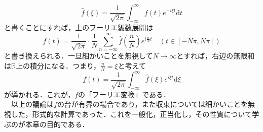 \documentclass[a4j]{jsbook}
\numberwithin{theorem}{chapter}  %
\begin{document}
\begin{equation*}
    \hat{f}(\xi)=\frac{1}{\sqrt{2\pi}}\int_{-\infty}^\infty f(t)e^{-i\xi t}\mathrm{d}t
\end{equation*}
と書くことにすれば，上のフーリエ級数展開は
\begin{equation*}
    f(t)=\frac{1}{\sqrt{2\pi}}\cdot\frac{1}{N}\sum_{n=-\infty}^\infty\hat{f}\left(\frac{n}{N}\right)e^{i\frac{n}{N}t}\quad (t\in[-N\pi, N\pi])
\end{equation*}
と書き換えられる．一旦細かいことを無視して\(N\to\infty\)とすれば，右辺の無限和は\(\mathbb{R}\)上の積分になる．つまり，\(\displaystyle\frac{n}{N}=\xi\)と考えて
\begin{equation*}
    f(t)=\frac{1}{\sqrt{2\pi}}\int_{-\infty}^\infty\hat{f}(\xi)e^{i\xi t}\mathrm{d}\xi
\end{equation*}
が導かれる．これが，\(f\)の「フーリエ変換」である．\\
　以上の議論は\(f\)の台が有界の場合であり，また収束については細かいことを無視した，形式的な計算であった．これを一般化，正当化し，その性質について学ぶのが本章の目的である．
\end{document}
